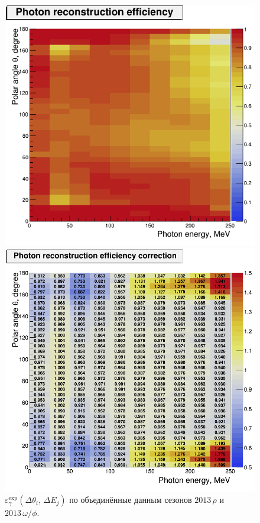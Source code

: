 \begin{figure}[htbp]
    \begin{minipage}[t]{0.48\textwidth}
    	\centering
        \includegraphics[width=\textwidth]{img/eff_scan2013_tot.png}
        \caption{$\varepsilon_{\gamma}^{\text{exp}} ( \Delta \theta_i, \, \Delta E_j )$ 
        	по объединённые данным сезонов $2013 \, \rho$ и $2013 \, \omega / \phi$.}\label{fig:3pi_eff_gamma}
    \end{minipage}
    \hfill
    \begin{minipage}[t]{0.48\textwidth}
    	\centering
        \includegraphics[width=\textwidth]{img/ratio_2d_omphi_plus_rho.png}

\end{minipage}
\end{figure}
